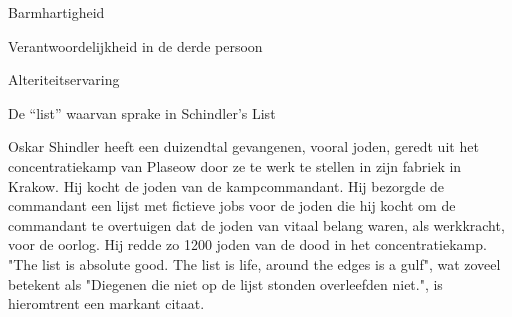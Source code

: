 \documentclass[main.tex]{subfiles}
\begin{document}
\begin{examenvraag}
    \begin{vraag}
        Barmhartigheid
    \end{vraag}

    \begin{antwoord}

    \end{antwoord}
\end{examenvraag}


\begin{examenvraag}
    \begin{vraag}
        Verantwoordelijkheid in de derde persoon
    \end{vraag}

    \begin{antwoord}

    \end{antwoord}
\end{examenvraag}


\begin{examenvraag}
    \begin{vraag}
        Alteriteitservaring
    \end{vraag}

    \begin{antwoord}

    \end{antwoord}
\end{examenvraag}


\begin{examenvraag}
    \begin{vraag}
        De “list” waarvan sprake in Schindler’s List
    \end{vraag}

    \begin{antwoord}
        Oskar Shindler heeft een duizendtal gevangenen, vooral joden, geredt uit het concentratiekamp van Plaseow door ze te werk te stellen in zijn fabriek in Krakow.
        Hij kocht de joden van de kampcommandant.
        Hij bezorgde de commandant een lijst met fictieve jobs voor de joden die hij kocht om de commandant te overtuigen dat de joden van vitaal belang waren, als werkkracht, voor de oorlog.
        Hij redde zo 1200 joden van de dood in het concentratiekamp.
        "The list is absolute good. The list is life, around the edges is a gulf", wat zoveel betekent als "Diegenen die niet op de lijst stonden overleefden niet.", is hieromtrent een markant citaat.
    \end{antwoord}
\end{examenvraag}
\end{document}
